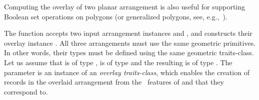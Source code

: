 Computing the overlay of two planar arrangement is also useful for
supporting Boolean set operations on polygons (or generalized polygons,
see, e.g.,~\cite{cgal:behhms-cbcab-02}).

The function  accepts
two input arrangement instances  and , and constructs
their overlay instance . All three arrangements must use the
same geometric primitives. In other words, their types must be defined 
using the same geometric traits-class. Let us assume that  is of 
type ,  is of type
 and the resulting  is of type 
. The  parameter is
an instance of an {\em overlay traits-class}, which enables the creation of
 records in the overlaid arrangement from the \dcel\ features
of  and  that they correspond to.

